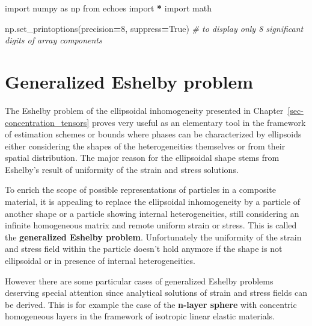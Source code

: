 \documentclass[
  a4paper,
  numbers=noendperiod,
  DIV=12]{scrreprt}
\newenvironment{Shaded}{\begin{snugshade}}{\end{snugshade}}
\newcommand{\CommentTok}[1]{\textcolor[rgb]{0.56,0.35,0.01}{\textit{#1}}}
\newcommand{\DecValTok}[1]{\textcolor[rgb]{0.00,0.00,0.81}{#1}}
\newcommand{\ImportTok}[1]{#1}
\newcommand{\NormalTok}[1]{#1}
\newcommand{\OperatorTok}[1]{\textcolor[rgb]{0.81,0.36,0.00}{\textbf{#1}}}
\newcommand{\VariableTok}[1]{\textcolor[rgb]{0.00,0.00,0.00}{#1}}
\begin{document}
\begin{tcolorbox}[enhanced jigsaw, arc=.35mm, bottomrule=.15mm, bottomtitle=1mm, breakable, colback=white, colbacktitle=quarto-callout-tip-color!10!white, colframe=quarto-callout-tip-color-frame, coltitle=black, left=2mm, leftrule=.75mm, opacityback=0, opacitybacktitle=0.6, rightrule=.15mm, title={Imports}, titlerule=0mm, toprule=.15mm, toptitle=1mm]

\begin{Shaded}
\begin{Highlighting}[]
\ImportTok{import}\NormalTok{ numpy }\ImportTok{as}\NormalTok{ np}
\ImportTok{from}\NormalTok{ echoes }\ImportTok{import} \OperatorTok{*}
\ImportTok{import}\NormalTok{ math}

\NormalTok{np.set\_printoptions(precision}\OperatorTok{=}\DecValTok{8}\NormalTok{, suppress}\OperatorTok{=}\VariableTok{True}\NormalTok{)}
\CommentTok{\# to display only 8 significant digits of array components}
\end{Highlighting}
\end{Shaded}

\end{tcolorbox}

\section{Generalized Eshelby problem}\label{generalized-eshelby-problem}

The Eshelby problem of the ellipsoidal inhomogeneity presented in
Chapter~\ref{sec-concentration_tensors} proves very useful as an
elementary tool in the framework of estimation schemes or bounds where
phases can be characterized by ellipsoids either considering the shapes
of the heterogeneities themselves or from their spatial distribution.
The major reason for the ellipsoidal shape stems from Eshelby's result
of uniformity of the strain and stress solutions.

To enrich the scope of possible representations of particles in a
composite material, it is appealing to replace the ellipsoidal
inhomogeneity by a particle of another shape or a particle showing
internal heterogeneities, still considering an infinite homogeneous
matrix and remote uniform strain or stress. This is called the
\textbf{generalized Eshelby problem}. Unfortunately the uniformity of
the strain and stress field within the particle doesn't hold anymore if
the shape is not ellipsoidal or in presence of internal heterogeneities.

However there are some particular cases of generalized Eshelby problems
deserving special attention since analytical solutions of strain and
stress fields can be derived. This is for example the case of the
\textbf{n-layer sphere} with concentric homogeneous layers in the
framework of isotropic linear elastic materials.
\end{document}
